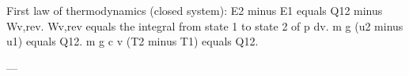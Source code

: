 First law of thermodynamics (closed system):  
E2 minus E1 equals Q12 minus Wv,rev.  
Wv,rev equals the integral from state 1 to state 2 of p dv.  
m g (u2 minus u1) equals Q12.  
m g c v (T2 minus T1) equals Q12.  

---